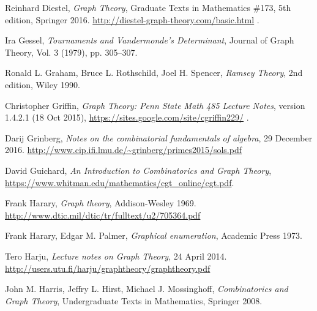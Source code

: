 \documentclass[numbers=enddot,12pt,final,onecolumn,notitlepage]{scrartcl}%
\theoremstyle{definition}
\begin{document}
\begin{thebibliography}{9999999999}

Reinhard Diestel, \textit{Graph Theory},
Graduate Texts in Mathematics \#173, 5th edition, Springer 2016.
\newline \url{http://diestel-graph-theory.com/basic.html} .

Ira Gessel, \textit{Tournaments and
Vandermonde's Determinant}, Journal of Graph Theory, Vol. 3 (1979), pp. 305--307.

Ronald L. Graham, Bruce L. Rothschild,
Joel H. Spencer, \textit{Ramsey Theory}, 2nd edition,
Wiley 1990.

Christopher Griffin,
\textit{Graph Theory: Penn State Math 485 Lecture Notes},
version 1.4.2.1 (18 Oct 2015),
\newline\url{https://sites.google.com/site/cgriffin229/} .

Darij Grinberg, \textit{Notes on the combinatorial
fundamentals of algebra}, 29 December 2016.
\newline\url{http://www.cip.ifi.lmu.de/~grinberg/primes2015/sols.pdf}

David Guichard,
\textit{An Introduction to Combinatorics and Graph Theory},
\newline\url{https://www.whitman.edu/mathematics/cgt_online/cgt.pdf}.

Frank Harary,
\textit{Graph theory},
Addison-Wesley 1969.
\newline\url{http://www.dtic.mil/dtic/tr/fulltext/u2/705364.pdf}

Frank Harary, Edgar M. Palmer,
\textit{Graphical enumeration},
Academic Press 1973.

Tero Harju,
\textit{Lecture notes on Graph Theory},
24 April 2014.
\newline\url{http://users.utu.fi/harju/graphtheory/graphtheory.pdf}

John M. Harris, Jeffry L. Hirst, Michael J. Mossinghoff,
\textit{Combinatorics and Graph Theory}, Undergraduate Texts in
Mathematics, Springer 2008.



\end{thebibliography}
\end{document}
